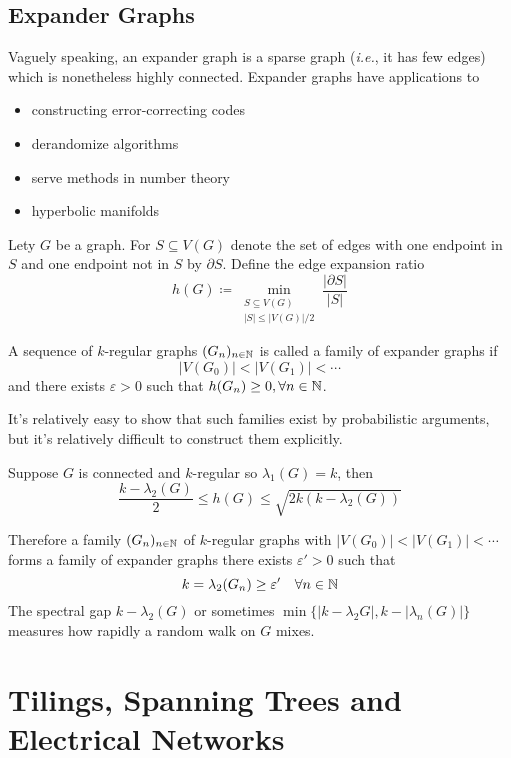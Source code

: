 \section{Expander Graphs}
Vaguely speaking, an expander graph is a sparse graph (\textit{i.e.}, it has few edges) which is nonetheless highly connected.
Expander graphs have applications to
\begin{itemize}
\item constructing error-correcting codes
\item derandomize algorithms
\item serve methods in number theory
\item hyperbolic manifolds
\end{itemize}

\begin{definition}
Lety \(G\) be a graph.
For \(S\subseteq V(G)\) denote the set of edges with one endpoint in \(S\) and one endpoint not in \(S\) by \(\partial S\).
Define the edge expansion ratio
\[ h(G)\coloneqq \min_{\substack{S\subseteq V(G)\\|S|\leq|V(G)|/2}} \frac{|\partial S|}{|S|} \]
\end{definition}
\begin{definition}
A sequence of \(k\)-regular graphs \((G_n)_{n\in\mathbb{N}}\) is called a family of expander graphs if
\[ |V(G_0)|<|V(G_1)|<\cdots \]
and there exists \(\varepsilon>0\) such that \(h(G_n)\geq0,\forall n\in\mathbb{N}\).
\end{definition}
\begin{remark}
It's relatively easy to show that such families exist by probabilistic arguments, but it's relatively difficult to construct them explicitly.
\end{remark}
\begin{theorem}
Suppose \(G\) is connected and \(k\)-regular so \(\lambda_1(G)=k\), then
\[ \frac{k-\lambda_2(G)}{2}\leq h(G)\leq \sqrt{2k(k-\lambda_2(G))} \]
\end{theorem}
Therefore a family \((G_n)_{n\in\mathbb{N}}\) of \(k\)-regular graphs with \(|V(G_0)|<|V(G_1)|<\cdots\) forms a family of expander graphs \iff there exists \(\varepsilon'>0\) such that
\[ k=\lambda_2(G_n)\geq\varepsilon' \quad \forall n\in\mathbb{N} \]
The spectral gap \(k-\lambda_2(G)\) or sometimes \( \min\{|k-\lambda_2{G}|,k-|\lambda_n(G)|\} \) measures how rapidly a random walk on \(G\) mixes.



\chapter[Tilings \& Spanning Trees]{Tilings, Spanning Trees and Electrical Networks}


